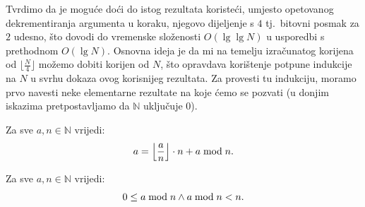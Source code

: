 \documentclass[12pt]{scrartcl}
\begin{document}
Tvrdimo da je moguće doći do istog rezultata koristeći, umjesto opetovanog dekrementiranja argumenta u koraku, njegovo dijeljenje s $4$
tj.\ bitovni posmak za $2$ udesno, što dovodi do vremenske složenosti $O(\lg\lg N)$ u usporedbi s prethodnom $O(\lg N)$. Osnovna ideja je
da mi na temelju izračunatog korijena od $\lfloor\frac{N}{4}\rfloor$ možemo dobiti korijen od $N$, što opravdava korištenje potpune
indukcije na $N$ u svrhu dokaza ovog korisnijeg rezultata. Za provesti tu indukciju, moramo prvo navesti neke elementarne rezultate
na koje ćemo se pozvati (u donjim iskazima pretpostavljamo da $\mathbb{N}$ uključuje $0$).

\begin{lema}
    Za sve $a,n\in\mathbb{N}$ vrijedi:
    \begin{equation}\label{lm:1}
        a=\left\lfloor\frac{a}{n}\right\rfloor\cdot n + a \bmod n\text.
    \end{equation}
\end{lema}

\begin{lema}
    Za sve $a,n\in\mathbb{N}$ vrijedi:
    \begin{equation}\label{lm:2}
        0 \leq a \bmod n \land a \bmod n < n\text.
    \end{equation}
\end{lema}
\end{document}
